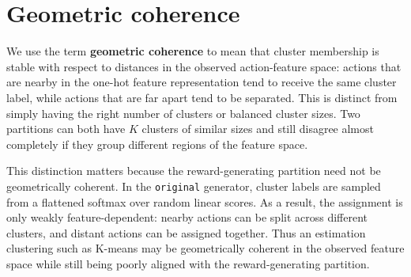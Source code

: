 \documentclass[11pt]{article}
\begin{document}
\appendix
\section{Geometric coherence}
We use the term \textbf{geometric coherence} to mean that cluster membership is stable with respect to distances in the observed action-feature space: actions that are nearby in the one-hot feature representation tend to receive the same cluster label, while actions that are far apart tend to be separated. This is distinct from simply having the right number of clusters or balanced cluster sizes. Two partitions can both have $K$ clusters of similar sizes and still disagree almost completely if they group different regions of the feature space.

This distinction matters because the reward-generating partition need not be geometrically coherent. In the \texttt{original} generator, cluster labels are sampled from a flattened softmax over random linear scores. As a result, the assignment is only weakly feature-dependent: nearby actions can be split across different clusters, and distant actions can be assigned together. Thus an estimation clustering such as K-means may be geometrically coherent in the observed feature space while still being poorly aligned with the reward-generating partition.
\end{document}
